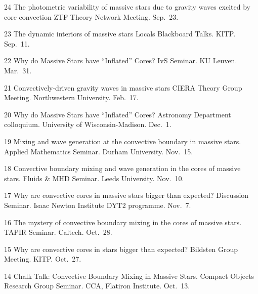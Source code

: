 
      {24}
      { 
        The photometric variability of massive stars due to gravity waves excited by core convection
      }
      {
        ZTF Theory Network Meeting. Sep.~23.
      }

\cvpub{}
      {23}
      { 
        The dynamic interiors of massive stars
      }
      {
        Locals Blackboard Talks. KITP. Sep.~11.
      }

\cvpub{}
      {22}
      { 
        Why do Massive Stars have ``Inflated'' Cores?
      }
      {
        IvS Seminar. KU Leuven. Mar.~31.
      }

\cvpub{}
      {21}
      { 
        Convectively-driven gravity waves in massive stars
      }
      {
        CIERA Theory Group Meeting. Northwestern University. Feb.~17.
      }



      {20}
      { 
        Why do Massive Stars have ``Inflated'' Cores?
      }
      {
        Astronomy Department colloquium. University of Wisconsin-Madison. Dec.~1.
      }

\cvpub{}
      {19}
      {
        Mixing and wave generation at the convective boundary in massive stars.  
      }
      {
        Applied Mathematics Seminar. Durham University. Nov.~15.
      }

\cvpub{}
      {18}
      {
         Convective boundary mixing and wave generation in the cores of massive stars. 
      }
      {
        Fluids \& MHD Seminar. Leeds University. Nov.~10.
      }

\cvpub{}
      {17}
      {
        Why are convective cores in massive stars bigger than expected?  
      }
      {
        Discussion Seminar. Isaac Newton Institute DYT2 programme. Nov.~7.
      }



\cvpub{}
      {16}
      {
        The mystery of convective boundary mixing in the cores of massive stars.
      }
      {
        TAPIR Seminar. Caltech. Oct.~28.
      }

\cvpub{}
      {15}
      {
        Why are convective cores in stars bigger than expected?  
      }
      {
        Bildsten Group Meeting. KITP. Oct.~27.
      }

\cvpub{}
      {14}
      {
        Chalk Talk: Convective Boundary Mixing in Massive Stars.  
      }
      {
        Compact Objects Research Group Seminar. CCA, Flatiron Institute. Oct.~13.
      }

